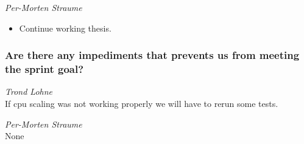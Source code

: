 \documentclass{article}
\begin{document}
\medskip

\noindent\textit{Per-Morten Straume}
\begin{itemize}
	\item
	Continue working thesis.
\end{itemize}


\subsubsection*{Are there any impediments that prevents us from meeting the sprint goal?}

\noindent\textit{Trond Lohne}\\
If cpu scaling was not working properly we will have to
rerun some tests.

\medskip

\noindent\textit{Per-Morten Straume}\\
None
\end{document}
